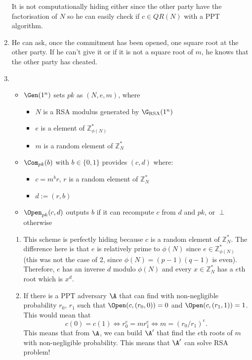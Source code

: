 \begin{solution}
\begin{enumerate}
		It is not computationally hiding either since the other party have the factorisation of $N$
		so he can easily check if $c \in QR(N)$ with a PPT algorithm.
		\item
		He can ask, once the commitment has been opened,
		one square root at the other party.
		If he can't give it or if it is not a square root of $m$, he knows that the other party has cheated.
		\item
		\begin{itemize}
			\item $\Gen(1^n)$ sets $pk$ as $(N,e,m)$, where
			\begin{itemize}
				\item $N$ is a RSA modulus generated by $\G_\mathrm{RSA}(1^n)$
				\item $e$ is a element of $\mathbb{Z}_{\phi(N)}^*$
				\item $m$ is a random element of $\mathbb{Z}_{N}^*$
			\end{itemize}
			\item $\Com_{pk}(b)$ with $b \in \{0,1\}$ provides $(c,d)$ where:
			\begin{itemize}
				\item $c = m^br$, $r$ is a random element of $\mathbb{Z}_N^*$
				\item $d := (r, b)$
			\end{itemize}
			\item $\Open_{pk}(c, d)$ outputs $b$ if it can recompute $c$ from $d$ and $pk$, or $\perp$ otherwise
		\end{itemize}
		\begin{enumerate}
			\item
			This scheme is perfectly hiding because $c$ is a random element of $\mathbb{Z}_N^*$.
			The difference here is that $e$ is relatively prime to $\phi(N)$ since $e \in \mathbb{Z}_{\phi(N)}^*$ (this was not the case of 2, since $\phi(N) = (p-1)(q-1)$ is even).
			Therefore, $e$ has an inverse $d$ modulo $\phi(N)$ and every $x \in \mathbb{Z}_N^*$ has a $e$th root which is $x^d$.
			\item
			If there is a PPT adversary $\A$ that can find with non-negligible probability
			$r_{0}$, $r_{1}$ such that $\Open(c, (r_{0}, 0))=0$ and
			$\Open(c, (r_{1}, 1))=1$. This would mean that
			\[ c(0)=c(1) \Leftrightarrow r_{0}^e=mr_{1}^e \Leftrightarrow m=(r_{0}/r_{1})^e. \]
			This means that from $\A$, we can build $\A'$ that find the $e$th roots of $m$ with non-negligible probability.
			This means that $\A'$ can solve RSA problem!
			

\end{enumerate}
\end{enumerate}
\end{solution}
